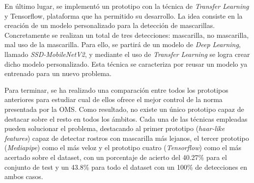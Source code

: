 En último lugar, se implementó un prototipo con la técnica de \textit{Transfer Learning} y Tensorflow, plataforma que ha permitido su desarrollo. La idea consiste en la creación de un modelo personalizado para la detección de mascarillas. Concretamente se realizan un total de tres detecciones: mascarilla, no mascarilla, mal uso de la mascarilla. Para ello, se partirá de un modelo de \textit{Deep Learning}, llamado \textit{SSD-MobileNetV2}, y mediante el uso de \textit{Transfer Learning} se logra crear dicho modelo personalizado. Esta técnica se caracteriza por reusar un modelo ya entrenado para un nuevo problema.

Para terminar, se ha realizado una comparación entre todos los prototipos anteriores para estudiar cual de ellos ofrece el mejor control de la norma presentada por la OMS. Como resultado, no existe un único prototipo capaz de destacar sobre el resto en todos los ámbitos. Cada una de las técnicas empleadas pueden solucionar el problema, destacando al primer prototipo (\textit{haar-like features}) capaz de detectar rostros con mascarilla más lejanos, el tercer prototipo (\textit{Mediapipe}) como el más veloz y el prototipo cuatro (\textit{Tensorflow}) como el más acertado sobre el dataset, con un porcentaje de acierto del 40.27\% para el conjunto de test y un 43.8\% para todo el dataset con un 100\% de detecciones en ambos casos.
